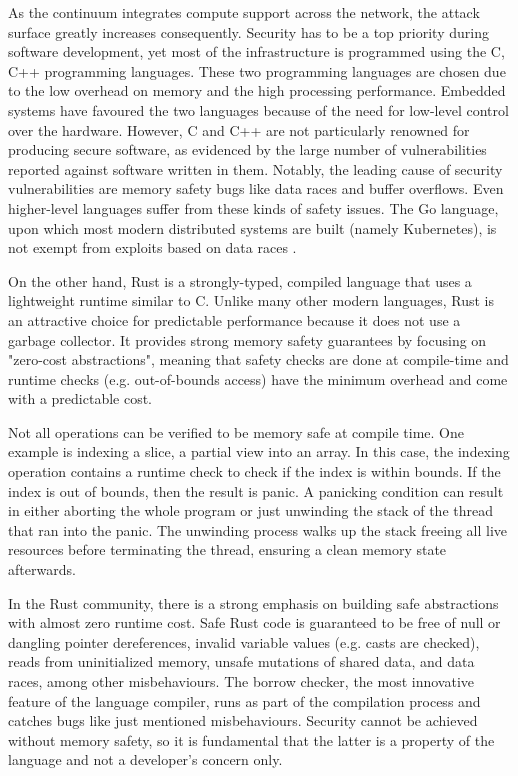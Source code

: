 As the continuum integrates compute support across the network, the attack surface greatly increases consequently. Security has to be a top priority during software development, yet most of the infrastructure is programmed using the C, C++ programming languages. These two programming languages are chosen due to the low overhead on memory and the high processing performance. Embedded systems have favoured the two languages because of the need for low-level control over the hardware. However, C and C++ are not particularly renowned for producing secure software, as evidenced by the large number of vulnerabilities reported against software written in them. Notably, the leading cause of security vulnerabilities are memory safety bugs like data races and buffer overflows. Even higher-level languages suffer from these kinds of safety issues. The Go language, upon which most modern distributed systems are built (namely Kubernetes), is not exempt from exploits based on data races \cite{go-data-races}.

On the other hand, Rust is a strongly-typed, compiled language that uses a lightweight runtime similar to C. Unlike many other modern languages, Rust is an attractive choice for predictable performance because it does not use a garbage collector. It provides strong memory safety guarantees by focusing on "zero-cost abstractions", meaning that safety checks are done at compile-time and runtime checks (e.g. out-of-bounds access) have the minimum overhead and come with a predictable cost.

Not all operations can be verified to be memory safe at compile time. One example is indexing a slice, a partial view into an array. In this case, the indexing operation contains a runtime check to check if the index is within bounds. If the index is out of bounds, then the result is panic. A panicking condition can result in either aborting the whole program or just unwinding the stack of the thread that ran into the panic. The unwinding process walks up the stack freeing all live resources before terminating the thread, ensuring a clean memory state afterwards.

In the Rust community, there is a strong emphasis on building safe abstractions with almost zero runtime cost. Safe Rust code is guaranteed to be free of null or dangling pointer dereferences, invalid variable values (e.g. casts are checked), reads from uninitialized memory, unsafe mutations of shared data, and data races, among other misbehaviours.  The borrow checker, the most innovative feature of the language compiler, runs as part of the compilation process and catches bugs like just mentioned misbehaviours. Security cannot be achieved without memory safety, so it is fundamental that the latter is a property of the language and not a developer's concern only.

